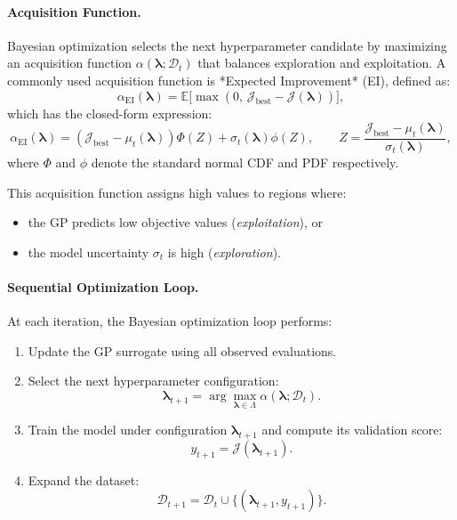 \documentclass[letterpaper, 12, one column]{article}
\begin{document}
\paragraph{Acquisition Function.}
Bayesian optimization selects the next hyperparameter candidate by maximizing an acquisition function $\alpha(\boldsymbol{\lambda}; \mathcal{D}_{t})$ that balances exploration and exploitation.  
A commonly used acquisition function is *Expected Improvement* (EI), defined as:
\begin{equation}
\label{eq:expected_improvement}
\alpha_{\mathrm{EI}}(\boldsymbol{\lambda})
= \mathbb{E}\big[ \max(0,\, \mathcal{J}_{\mathrm{best}} - \mathcal{J}(\boldsymbol{\lambda}) ) \big],
\end{equation}
which has the closed-form expression:
\begin{equation}
\label{eq:expected_improvement_closed_form}
\alpha_{\mathrm{EI}}(\boldsymbol{\lambda}) 
= (\mathcal{J}_{\mathrm{best}} - \mu_{t}(\boldsymbol{\lambda})) 
\Phi(Z) + \sigma_{t}(\boldsymbol{\lambda}) \phi(Z),
\qquad
Z = \frac{\mathcal{J}_{\mathrm{best}} - \mu_{t}(\boldsymbol{\lambda})}{\sigma_{t}(\boldsymbol{\lambda})},
\end{equation}
where $\Phi$ and $\phi$ denote the standard normal CDF and PDF respectively.

This acquisition function assigns high values to regions where:
\begin{itemize}
    \item the GP predicts low objective values (\textit{exploitation}), or
    \item the model uncertainty $\sigma_{t}$ is high (\textit{exploration}).
\end{itemize}

\paragraph{Sequential Optimization Loop.}
At each iteration, the Bayesian optimization loop performs:
\begin{enumerate}
    \item Update the GP surrogate using all observed evaluations.
    \item Select the next hyperparameter configuration:
    \begin{equation}
    \label{eq:next_hyperparameter}
    \boldsymbol{\lambda}_{t+1}
    = \arg\max_{\boldsymbol{\lambda} \in \Lambda}
    \alpha(\boldsymbol{\lambda}; \mathcal{D}_{t}).
    \end{equation}
    \item Train the model under configuration $\boldsymbol{\lambda}_{t+1}$ and compute its validation score:
    \begin{equation}
    \label{eq:validation_score}
    y_{t+1} = \mathcal{J}(\boldsymbol{\lambda}_{t+1}).
    \end{equation}
    \item Expand the dataset:
    \begin{equation}
    \label{eq:dataset_expansion}
    \mathcal{D}_{t+1} = \mathcal{D}_{t} \cup \{ (\boldsymbol{\lambda}_{t+1}, y_{t+1}) \}.
    \end{equation}
\end{enumerate}
\end{document}
